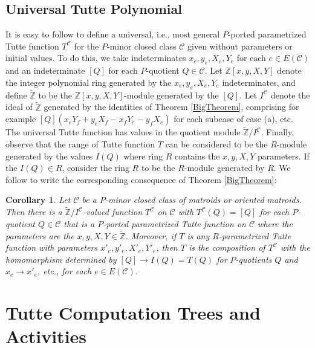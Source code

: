 \documentclass[12pt,leqno]{amsart}
\newtheorem{cor}[lem]{Corollary}
\theoremstyle{remark}
\begin{document}
\subsection{Universal Tutte Polynomial}
\label{UniversalSec}
It is easy to follow 
\cite{BollobasRiordanTuttePolyColored,Ellis-Monaghan-Traldi} to define
a universal, i.e., most general $P$-ported parametrized
Tutte function $T^{\mathcal{C}}$ for the $P$-minor closed class 
$\mathcal{C}$ given without parameters or initial values.  To do this,
we take indeterminates $x_e, y_e, X_e, Y_e$ for each $e\in E(\mathcal{C})$
and an indeterminate $[Q]$ for each $P$-quotient $Q\in\mathcal{C}$.
Let $\mathbb{Z}[x,y,X,Y]$ denote the integer polynomial ring generated by
the $x_e,y_e,X_e,Y_e$ indeterminates, and define $\widetilde{\mathbb{Z}}$
to be the $\mathbb{Z}[x,y,X,Y]$-module generated by the $[Q]$.  
Let $I^{\mathcal{C}}$ denote the ideal of $\widetilde{\mathbb{Z}}$ 
generated by the identities of Theorem \ref{BigTheorem}, comprising 
for example $[Q](x_eY_f+y_eX_f-x_fY_e-y_fX_e)$ for each subcase of
case (a), etc.  The universal Tutte function has values in the
quotient module $\widetilde{\mathbb{Z}}/I^{\mathcal{C}}$.  Finally,
observe that the range of Tutte function $T$  can be considered to be the
$R$-module generated by the values $I(Q)$ where ring $R$ contains the
$x,y,X,Y$ parameters. If the $I(Q)\in R$, consider
the ring $R$ to be the $R$-module generated by $R$.
We follow \cite{Ellis-Monaghan-Traldi} to write
the corresponding consequence of Theorem \ref{BigTheorem}:

\begin{cor}
\label{UniversalCor}
Let $\mathcal{C}$ be a $P$-minor closed class of matroids or 
oriented matroids.  Then there is a 
$\widetilde{\mathbb{Z}}/I^{\mathcal{C}}$-valued function 
$T^{\mathcal{C}}$ on $\mathcal{C}$ with $T^{\mathcal{C}}(Q)=[Q]$ for each $P$-quotient
$Q\in\mathcal{C}$ that is a $P$-ported parametrized Tutte function
on $\mathcal{C}$ where the parameters are the 
$x, y, X, Y \in \widetilde{\mathbb{Z}}$.  Moreover, if $T$ is any $R$-parametrized
Tutte function with parameters $x'_e, y'_e, X'_e, Y'_e$, then $T$ is the
composition of $T^{\mathcal{C}}$ with the homomorphism determined by
$[Q]\rightarrow I(Q)=T(Q)$ for $P$-quotients $Q$ and 
$x_e\rightarrow x'_e$, etc., for each $e\in E(\mathcal{C})$.
\end{cor}

\section{Tutte Computation Trees and Activities}
\label{Activity}
\end{document}
